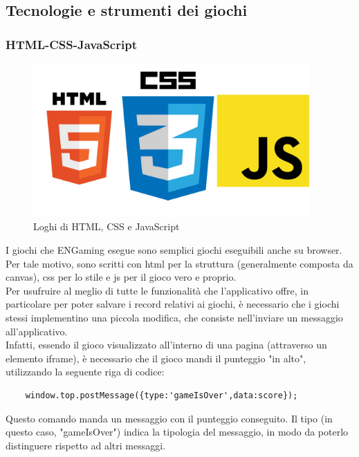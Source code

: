\subsection{Tecnologie e strumenti dei giochi}

\subsubsection{HTML-CSS-JavaScript}
\begin{figure}[h]
    \centering
    \includegraphics[width=300pt]{images/technologies/HTMLCSSJS.png}
    \caption{Loghi di HTML, CSS e JavaScript}
    \label{fig:HTMLCSSJS}
\end{figure}
I giochi che ENGaming esegue sono semplici giochi eseguibili anche su browser. Per tale motivo, sono scritti con \gls{html} per la struttura (generalmente composta da canvas), \gls{css} per lo stile e \gls{js} per il gioco vero e proprio.\\
Per usufruire al meglio di tutte le funzionalità che l'applicativo offre, in particolare per poter salvare i record relativi ai giochi, è necessario che i giochi stessi implementino una piccola modifica, che consiste nell'inviare un messaggio all'applicativo.\\
Infatti, essendo il gioco visualizzato all'interno di una pagina (attraverso un elemento iframe), è necessario che il gioco mandi il punteggio "in alto", utilizzando la seguente riga di codice:
\begin{lstlisting}
    window.top.postMessage({type:'gameIsOver',data:score});
\end{lstlisting}
Questo comando manda un messaggio con il punteggio conseguito. Il tipo (in questo caso, "gameIsOver") indica la tipologia del messaggio, in modo da poterlo distinguere rispetto ad altri messaggi.
\newpage
